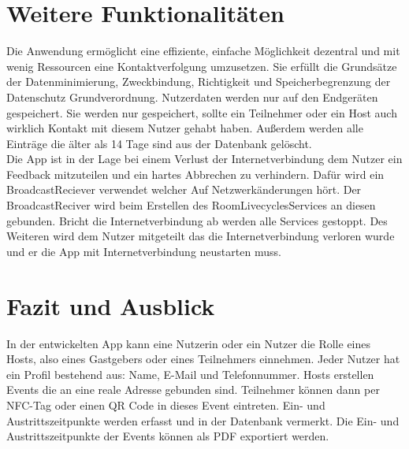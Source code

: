 \section{Weitere Funktionalitäten}
\label{sec:sonstiges}
Die Anwendung ermöglicht eine effiziente, einfache Möglichkeit dezentral und mit wenig Ressourcen eine Kontaktverfolgung umzusetzen.
Sie erfüllt die Grundsätze der Datenminimierung, Zweckbindung, Richtigkeit und Speicherbegrenzung der Datenschutz Grundverordnung. Nutzerdaten werden nur auf den Endgeräten gespeichert. 
Sie werden nur gespeichert, sollte ein Teilnehmer oder ein Host auch wirklich Kontakt mit diesem Nutzer gehabt haben. 
Außerdem werden alle Einträge die älter als 14 Tage sind aus der Datenbank gelöscht.\\
Die App ist in der Lage bei einem Verlust der Internetverbindung dem Nutzer ein Feedback mitzuteilen und ein hartes Abbrechen zu verhindern. 
Dafür wird ein BroadcastReciever verwendet welcher Auf Netzwerkänderungen hört. 
Der BroadcastReciver wird beim Erstellen des RoomLivecyclesServices an diesen gebunden.
 Bricht die Internetverbindung ab werden alle Services gestoppt. 
Des Weiteren wird dem Nutzer mitgeteilt das die Internetverbindung verloren wurde und er die App mit Internetverbindung neustarten muss.

\section{Fazit und Ausblick}
\label{sec:FuA}
In der entwickelten App kann eine Nutzerin oder ein Nutzer die Rolle eines Hosts, also eines Gastgebers oder eines Teilnehmers einnehmen.
Jeder Nutzer hat ein Profil bestehend aus: Name, E-Mail und Telefonnummer.
Hosts erstellen Events die an eine reale Adresse gebunden sind. Teilnehmer können dann per NFC-Tag oder einen QR Code in dieses Event eintreten. Ein- und Austrittszeitpunkte werden erfasst und in der Datenbank vermerkt.
Die Ein- und Austrittszeitpunkte der Events können als PDF exportiert werden.

